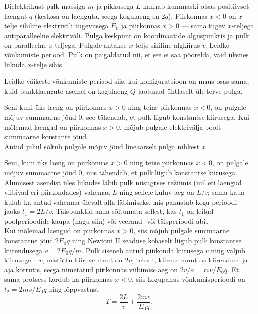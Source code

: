 
\osa Dielektrikust pulk massiga $m$ ja pikkusega $L$ kannab kummaski otsas positiivset laengut $q$ (keskosa on laenguta, seega kogulaeng on $2q$). Piirkonnas $x<0$ on $x$-telje sihiline elektriväli tugevusega $E_0$ ja piirkonnas $x>0$ --- sama tugev $x$-teljega antiparalleelne elektriväli. Pulga keskpunt on koordinaatide alguspunktis ja pulk on paralleelne $x$-teljega. Pulgale antakse $x$-telje sihiline algkiirus $v$. Leidke võnkumiste periood. Pulk on paigaldatud nii, et see ei saa pöörelda, vaid üksnes liikuda $x$-telje sihis.

\osa Leidke väikeste võnkumiste periood siis, kui konfiguratsioon on muus osas sama, kuid punktlaengute asemel on kogulaeng $Q$ jaotunud ühtlaselt üle terve pulga.

\hint
\osa Seni kuni üks laeng on piirkonnas $x>0$ ning teine piirkonnas $x<0$, on pulgale mõjuv summaarne jõud \num{0}; see tähendab, et pulk liigub konstantse kiirusega. Kui mõlemad laengud on piirkonnas $x>0$, mõjub pulgale elektrivälja poolt summaarne konstante jõud.\\
\osa Antud juhul sõltub pulgale mõjuv jõud lineaarselt pulga nihkest $x$.

\solu
\osa Seni, kuni üks laeng on piirkonnas $x>0$ ning teine piirkonnas $x<0$, on pulgale mõjuv summaarne jõud \num{0}, mis tähendab, et pulk liigub konstantse kiirusega. \\
Alumisest asendist üles liikudes läbib pulk niisuguses re\v ziimis
(mil eri laengud viibivad eri piirkondades) vahemaa $L$ ning
sellele kuluv aeg on $L/v$; sama kaua kulub ka antud vahemaa ülevalt alla
läbimiseks, mis panustab kogu perioodi jaoks $t_1=2L/v$.
Täispunktid anda sõltumata sellest, kas $t_1$ on leitud poolperioodide kaupa (nagu siin) või veerand- või täisperioodi abil.\\
Kui mõlemad laengud on piirkonnas $x> 0$, siis mõjub pulgale summaarne konstantne jõud $2E_0q$
ning Newtoni II seaduse kohaselt liigub pulk konstantse kiirendusega
$a=2E_0q/m$. Pulk siseneb antud piirkonda kiirusega $v$ ning väljub kiirusega $-v$, mistõttu kiiruse muut on $2v$; teisalt,
kiiruse muut on kiirenduse ja aja korrutis, seega nimetatud piirkonnas viibimise
aeg on $2v/a=mv/E_0q$. Et sama protsess kordub ka piirkonnas $x<0$, siis
kogupanus võnkumisperioodi on $t_2=2mv/E_0q$ ning lõppvastust
\[ T=\frac{2L}v+\frac {2mv}{E_0q}. \]


